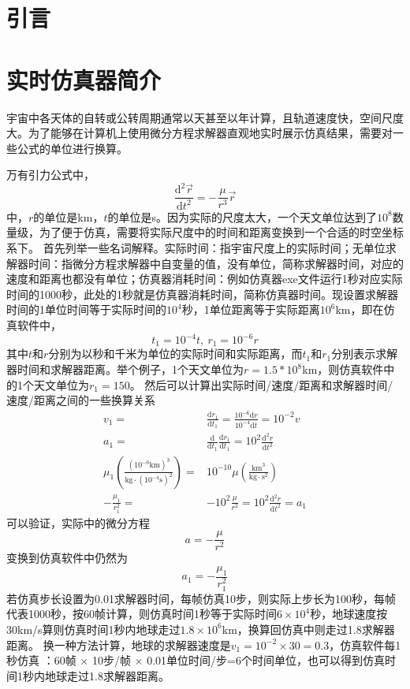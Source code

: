 \section{引\quad 言}


\section{实时仿真器简介}
宇宙中各天体的自转或公转周期通常以天甚至以年计算，且轨道速度快，空间尺度大。为了能够在计算机上使用微分方程求解器\cite{olzhn2021}直观地实时展示仿真结果，需要对一些公式的单位进行换算。\par
万有引力公式中，
$$\frac{\text{d}^2\vec{r}}{\text{d}t^2}=-\frac{\mu}{r^3}\vec{r}$$
中，$r$的单位是km，$t$的单位是s。因为实际的尺度太大，一个天文单位达到了$10^8$数量级，为了便于仿真，需要将实际尺度中的时间和距离变换到一个合适的时空坐标系下。
首先列举一些名词解释。实际时间：指宇宙尺度上的实际时间；无单位求解器时间：指微分方程求解器中自变量的值，没有单位，简称求解器时间，对应的速度和距离也都没有单位；仿真器消耗时间：例如仿真器exe文件运行1秒对应实际时间的1000秒，此处的1秒就是仿真器消耗时间，简称仿真器时间。现设置求解器时间的1单位时间等于实际时间的$10^4$秒，1单位距离等于实际距离$10^6$km，即在仿真软件中，
$$t_1=10^{-4}t,\ r_1=10^{-6}r$$
其中$t$和$r$分别为以秒和千米为单位的实际时间和实际距离，而$t_1$和$r_1$分别表示求解器时间和求解器距离。举个例子，1个天文单位为$r=1.5*10^8$km，则仿真软件中的1个天文单位为$r_1=150$。
然后可以计算出实际时间/速度/距离和求解器时间/速度/距离之间的一些换算关系
$$\begin{aligned}
v_1 =& \frac{\text{d}r_1}{\text{d}t_1}
 = \frac{10^{-6}\text{d}r}{10^{-4}\text{d}t} = 10^{-2}v \\
a_1 =& \frac{\text{d}}{\text{d}t_1}\frac{\text{d}r_1}{\text{d}t_1}
 = 10^2\frac{\text{d}^2r}{\text{d}t^2} \\
\mu_1(\frac{(10^{-6}\text{km})^3}{\text{kg}\cdot(10^{-4}\text{s})^2})
 =& 10^{-10}\mu(\frac{\text{km}^3}{\text{kg}\cdot \text{s}^2}) \\
-\frac{\mu_1}{r_1^2} =& -10^2\frac{\mu}{r^2} = 10^2\frac{\text{d}^2r}{\text{d}t^2} = a_1
\end{aligned}$$
可以验证，实际中的微分方程
$$a=-\frac{\mu}{r^2}$$
变换到仿真软件中仍然为
$$a_1=-\frac{\mu_1}{r_1^2}$$
若仿真步长设置为0.01求解器时间，每帧仿真10步，则实际上步长为100秒，每帧代表1000秒，按60帧计算，则仿真时间1秒等于实际时间$6\times10^4$秒，地球速度按30km/s算则仿真时间1秒内地球走过$1.8\times10^6$km，换算回仿真中则走过1.8求解器距离。
换一种方法计算，地球的求解器速度是$v_1=10^{-2}\times30=0.3$，仿真软件每1秒仿真 ：60帧 $\times$ 10步/帧 $\times$ 0.01单位时间/步=6个时间单位，也可以得到仿真时间1秒内地球走过1.8求解器距离。

